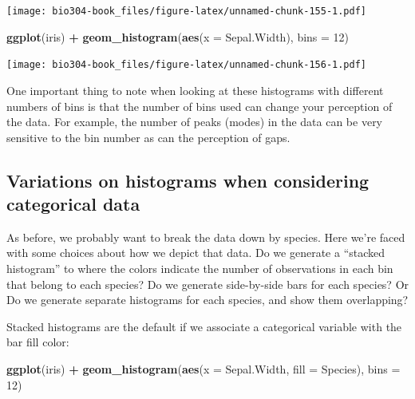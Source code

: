 \documentclass[]{book}
\newenvironment{Shaded}{\begin{snugshade}}{\end{snugshade}}
\newcommand{\DataTypeTok}[1]{\textcolor[rgb]{0.13,0.29,0.53}{#1}}
\newcommand{\DecValTok}[1]{\textcolor[rgb]{0.00,0.00,0.81}{#1}}
\newcommand{\KeywordTok}[1]{\textcolor[rgb]{0.13,0.29,0.53}{\textbf{#1}}}
\newcommand{\NormalTok}[1]{#1}
\newcommand{\OperatorTok}[1]{\textcolor[rgb]{0.81,0.36,0.00}{\textbf{#1}}}
\newcommand{\StringTok}[1]{\textcolor[rgb]{0.31,0.60,0.02}{#1}}
\theoremstyle{definition}
\theoremstyle{definition}
\theoremstyle{definition}
\theoremstyle{remark}
\begin{document}
\texttt{[image: bio304-book\_files/figure-latex/unnamed-chunk-155-1.pdf]}

\begin{Shaded}
\begin{Highlighting}[]
\KeywordTok{ggplot}\NormalTok{(iris) }\OperatorTok{+}\StringTok{ }
\StringTok{  }\KeywordTok{geom_histogram}\NormalTok{(}\KeywordTok{aes}\NormalTok{(}\DataTypeTok{x =}\NormalTok{ Sepal.Width), }\DataTypeTok{bins =} \DecValTok{12}\NormalTok{)}
\end{Highlighting}
\end{Shaded}

\texttt{[image: bio304-book\_files/figure-latex/unnamed-chunk-156-1.pdf]}

One important thing to note when looking at these histograms with
different numbers of bins is that the number of bins used can change
your perception of the data. For example, the number of peaks (modes) in
the data can be very sensitive to the bin number as can the perception
of gaps.

\hypertarget{variations-on-histograms-when-considering-categorical-data}{%
\subsection{Variations on histograms when considering categorical
data}\label{variations-on-histograms-when-considering-categorical-data}}

As before, we probably want to break the data down by species. Here
we're faced with some choices about how we depict that data. Do we
generate a ``stacked histogram'' to where the colors indicate the number
of observations in each bin that belong to each species? Do we generate
side-by-side bars for each species? Or Do we generate separate
histograms for each species, and show them overlapping?

Stacked histograms are the default if we associate a categorical
variable with the bar fill color:

\begin{Shaded}
\begin{Highlighting}[]
\KeywordTok{ggplot}\NormalTok{(iris) }\OperatorTok{+}\StringTok{ }
\StringTok{  }\KeywordTok{geom_histogram}\NormalTok{(}\KeywordTok{aes}\NormalTok{(}\DataTypeTok{x =}\NormalTok{ Sepal.Width, }\DataTypeTok{fill =}\NormalTok{ Species), }
                 \DataTypeTok{bins =} \DecValTok{12}\NormalTok{)}
\end{Highlighting}
\end{Shaded}
\end{document}
